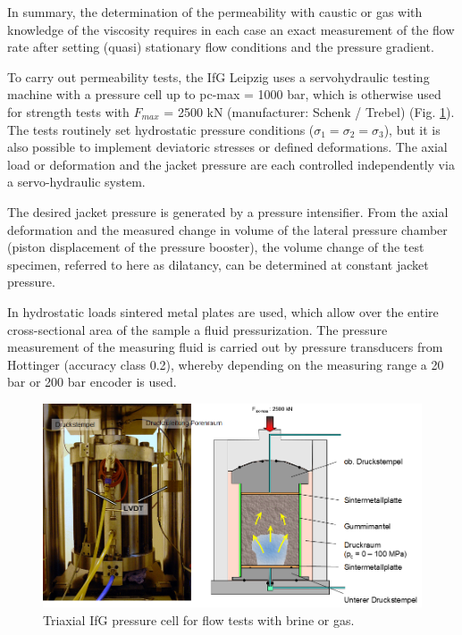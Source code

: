 In summary, the determination of the permeability with caustic or gas with knowledge of the viscosity requires in each 
case an exact measurement of the flow rate after setting (quasi) stationary flow conditions and the pressure gradient.

To carry out permeability tests, the IfG Leipzig uses a servohydraulic testing machine with a pressure cell up to pc-max = 1000 bar, 
which is otherwise used for strength tests with $F_{max}$ = 2500 kN (manufacturer: Schenk / Trebel) (Fig. \ref{fig:ifglabph4}). The tests 
routinely set hydrostatic pressure conditions ($\sigma_1 = \sigma_2 = \sigma_3$), but it is also possible to implement 
deviatoric stresses or defined deformations. The axial load or deformation and the jacket pressure are each controlled 
independently via a servo-hydraulic system. 

The desired jacket pressure is generated by a pressure intensifier. From the axial deformation and the measured change in 
volume of the lateral pressure chamber (piston displacement of the pressure booster), the volume change of the test specimen, 
referred to here as dilatancy, can be determined at constant jacket pressure.

In hydrostatic loads sintered metal plates are used, which allow over the entire cross-sectional area of the sample a fluid 
pressurization. The pressure measurement of the measuring fluid is carried out by pressure transducers from Hottinger 
(accuracy class 0.2), whereby depending on the measuring range a 20 bar or 200 bar encoder is used.

\begin{figure}[!ht]
\centering
\includegraphics[width=1\textwidth]{./figures/ifg-lab-photo4.png}
\caption{Triaxial IfG pressure cell for flow tests with brine or gas.}
\label{fig:ifglabph4}
\end{figure}

